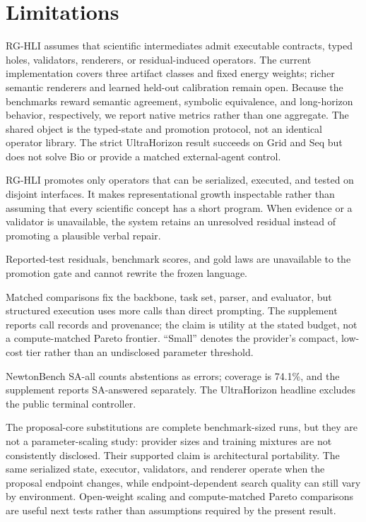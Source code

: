 \documentclass[letterpaper]{article}
\newcommand{\methodshort}{\textsc{RG-HLI}\xspace}
\begin{document}
\section{Limitations}

\methodshort assumes that scientific intermediates admit executable contracts,
typed holes, validators, renderers, or residual-induced operators. The current
implementation covers three artifact classes and fixed energy weights; richer
semantic renderers and learned held-out calibration remain open. Because the
benchmarks reward semantic agreement, symbolic equivalence, and long-horizon
behavior, respectively, we report native metrics rather than one aggregate.
The shared object is the typed-state and promotion protocol, not an identical
operator library. The strict UltraHorizon result succeeds on Grid and Seq but
does not solve Bio or provide a matched external-agent control.

RG-HLI promotes only operators that can be serialized, executed, and tested on
disjoint interfaces. It makes representational growth inspectable rather than
assuming that every scientific concept has a short program. When evidence or a
validator is unavailable, the system retains an unresolved residual instead of
promoting a plausible verbal repair.

Reported-test residuals, benchmark scores, and gold laws are unavailable to the
promotion gate and cannot rewrite the frozen language.

Matched comparisons fix the backbone, task set, parser, and evaluator, but
structured execution uses more calls than direct prompting. The supplement
reports call records and provenance; the claim is utility at the stated
budget, not a compute-matched Pareto frontier. ``Small'' denotes the provider's
compact, low-cost tier rather than an undisclosed parameter threshold.

NewtonBench SA-all counts abstentions as errors; coverage is 74.1\%, and the
supplement reports SA-answered separately. The UltraHorizon headline excludes
the public terminal controller.

The proposal-core substitutions are complete benchmark-sized runs, but they are
not a parameter-scaling study: provider sizes and training mixtures are not
consistently disclosed. Their supported claim is architectural portability.
The same serialized state, executor, validators, and renderer operate when the
proposal endpoint changes, while endpoint-dependent search quality can still
vary by environment. Open-weight scaling and compute-matched Pareto comparisons
are useful next tests rather than assumptions required by the present result.
\end{document}
